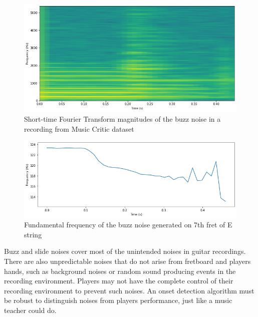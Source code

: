 \begin{figure}
    \centering
    \includegraphics[width=\columnwidth]{methods/realbuzzstft.png}
    \caption{Short-time Fourier Transform magnitudes of the buzz noise in a recording from Music Critic dataset}
    \label{fig:realbuzz}
\end{figure}

\begin{figure}
    \centering
    \includegraphics[width=\columnwidth]{methods/B_E_7_f0.png}
    \caption{Fundamental frequency of the buzz noise generated on 7th fret of E string}
    \label{fig:buzzf0}
\end{figure}

Buzz and slide noises cover most of the unintended noises in guitar recordings. There are also unpredictable noises that do not arise from fretboard and players hands, such as background noises or random sound producing events in the recording environment. Players may not have the complete control of their recording environment to prevent such noises. An onset detection algorithm must be robust to distinguish noises from players performance, just like a music teacher could do.